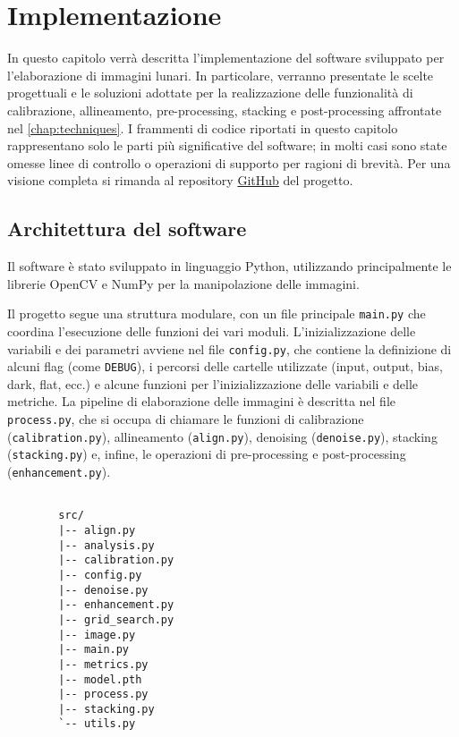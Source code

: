 \chapter{Implementazione} \label{chap:implementation}

In questo capitolo verrà descritta l'implementazione del software sviluppato per l'elaborazione di immagini lunari. In particolare, verranno presentate le scelte progettuali e le soluzioni adottate per la realizzazione delle funzionalità di calibrazione, allineamento, pre-processing, stacking e post-processing affrontate nel \cref{chap:techniques}. I frammenti di codice riportati in questo capitolo rappresentano solo le parti più significative del software; in molti casi sono state omesse linee di controllo o operazioni di supporto per ragioni di brevità. Per una visione completa si rimanda al repository \href{https://github.com/Spina02/Moon-Stacker.git}{GitHub} del progetto.

\section{Architettura del software} \label{sec:architecture}

Il software è stato sviluppato in linguaggio Python, utilizzando principalmente le librerie OpenCV e NumPy per la manipolazione delle immagini.


\begin{multicols}{2}

    Il progetto segue una struttura modulare, con un file principale \texttt{main.py} che coordina l'esecuzione delle funzioni dei vari moduli. L'inizializzazione delle variabili e dei parametri avviene nel file \texttt{config.py}, che contiene la definizione di alcuni flag (come \texttt{DEBUG}), i percorsi delle cartelle utilizzate (input, output, bias, dark, flat, ecc.) e alcune funzioni per l'inizializzazione delle variabili e delle metriche. La pipeline di elaborazione delle immagini è descritta nel file \texttt{process.py}, che si occupa di chiamare le funzioni di calibrazione (\texttt{calibration.py}), allineamento (\texttt{align.py}), denoising (\texttt{denoise.py}), stacking (\texttt{stacking.py}) e, infine, le operazioni di pre-processing e post-processing (\texttt{enhancement.py}).

    \columnbreak

    \begin{verbatim}
         
        src/
        |-- align.py
        |-- analysis.py
        |-- calibration.py
        |-- config.py
        |-- denoise.py
        |-- enhancement.py
        |-- grid_search.py
        |-- image.py
        |-- main.py
        |-- metrics.py
        |-- model.pth
        |-- process.py
        |-- stacking.py
        `-- utils.py
    \end{verbatim}

    \end{multicols}

